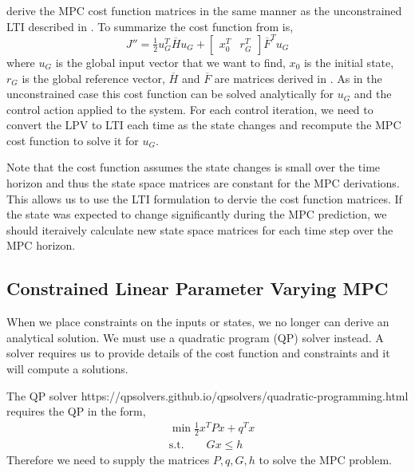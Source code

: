 \documentclass{article}
\newcommand{\doublebar}[1]{\overline{#1}}
\begin{document}
derive the MPC cost function matrices in the same manner as the unconstrained LTI described in
. To summarize the cost function from  is,
\begin{equation}
    J'' = \tfrac{1}{2}u_G^T\doublebar{H}u_G +  \begin{bmatrix} x_0^T & r_G^T \end{bmatrix}\doublebar{F}^Tu_G
\end{equation}
where $u_G$ is the global input vector that we want to find, $x_0$ is the initial state, $r_G$ is the global reference
vector, $\doublebar{H}$ and $\doublebar{F}$ are matrices derived in . As in the
unconstrained case this cost function can be solved analytically for $u_G$ and the control action applied to the
system. For each control iteration, we need to convert the LPV to LTI each time as the state changes and recompute the
MPC cost function to solve it for $u_G$.

Note that the cost function assumes the state changes is small over the time horizon and thus the state space matrices
are constant for the MPC derivations. This allows us to use the LTI formulation to dervie the cost function matrices. If
the state was expected to change significantly during the MPC prediction, we should iteraively calculate new state space
matrices for each time step over the MPC horizon.

\subsection{Constrained Linear Parameter Varying MPC}

When we place constraints on the inputs or states, we no longer can derive an analytical solution. We must use a
quadratic program (QP) solver instead. A solver requires us to provide details of the cost function and constraints
and it will compute a solutions.

\begin{tcolorbox}[title={Using QPSolver in Python}]
    The QP solver https://qpsolvers.github.io/qpsolvers/quadratic-programming.html requires the QP in the form,
    \begin{align}
        & \min \frac{1}{2}x^TPx+q^Tx \\
        & \text{s.t.} \qquad Gx \leq h
    \end{align}
    Therefore we need to supply the matrices $P, q, G, h$ to solve the MPC problem.
\end{tcolorbox}
\end{document}
